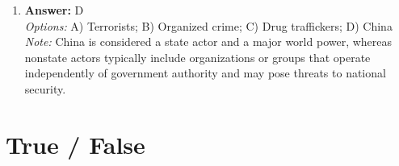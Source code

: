 \documentclass[12pt]{article}
\begin{document}
\begin{enumerate}[label=\arabic*.]
\\ \textit{Note:} Direct diplomacy refers to the process by which members of Congress engage in negotiations and discussions directly with foreign governments, thereby influencing foreign policy and international relations without intermediaries.
\item \textbf{Answer:} D
\\ \textit{Options:} A) Terrorists; B) Organized crime; C) Drug traffickers; D) China
\\ \textit{Note:} China is considered a state actor and a major world power, whereas nonstate actors typically include organizations or groups that operate independently of government authority and may pose threats to national security.
\end{enumerate}

\section*{True / False}
\end{document}
